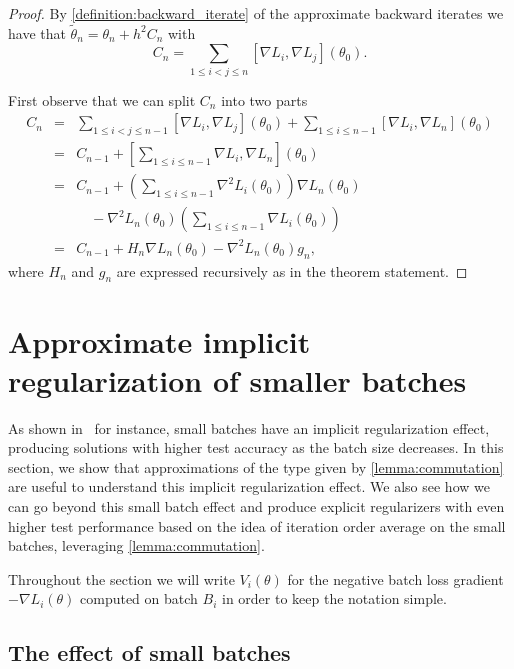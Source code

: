 \documentclass[10pt]{article} %
\theoremstyle{plain}
\theoremstyle{definition}
\theoremstyle{remark}
\begin{document}
\begin{proof}
By \cref{definition:backward_iterate} of the approximate backward iterates we have that $\tilde \theta_n = \theta_n + h^2 C_n$ with 
\[
C_n = \sum_{1\leq i<j\leq n} [\nabla L_i, \nabla L_j] (\theta_0).
\]

First observe that we can split $C_n$ into two parts
\begin{eqnarray*}
C_n 
& = & \sum_{1\leq i<j\leq n-1} [\nabla L_i, \nabla L_j] (\theta_0) + \sum_{1\leq i \leq n-1} [\nabla L_i, \nabla L_n] (\theta_0)\\
& = & C_{n-1} + [\sum_{1\leq i \leq n-1} \nabla L_i, \nabla L_n](\theta_0) \\
& = & C_{n-1} + \left(\sum_{1\leq i \leq n-1} \nabla^2 L_i(\theta_0) \right)\nabla L_n(\theta_0) \\
&   & \quad - \nabla^2 L_n(\theta_0) \left(\sum_{1\leq i \leq n-1} \nabla L_i(\theta_0)\right) \\
& = & C_{n-1} + H_n \nabla L_n(\theta_0) -  \nabla^2 L_n(\theta_0) g_n,
\end{eqnarray*}
where $H_n$ and $g_n$ are expressed recursively as in the theorem statement.
\end{proof}
 
\section{Approximate implicit regularization of smaller batches} \label{appendix:implicit regularization}

As shown in~\cite{keskar2017large,smith2017don,smith2021on,dherin2022why} for instance,  small batches have an implicit regularization effect, producing solutions with higher test accuracy as the batch size decreases. In this section, we show that approximations of the type given by \cref{lemma:commutation} are useful to understand this implicit regularization effect. We also see how we can go beyond this small batch effect and produce explicit regularizers with even higher test performance based on the idea of iteration order average on the small batches, leveraging \cref{lemma:commutation}.

Throughout the section we will write $V_i(\theta)$ for the negative batch loss gradient $-\nabla L_i(\theta)$ computed on batch $B_i$ in order to keep the notation simple.


\subsection{The effect of small batches}
\end{document}
